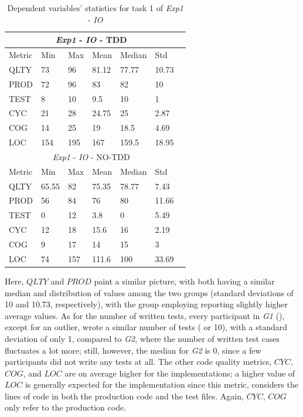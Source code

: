 \begin{table}[H]
    \begin{center} 
        \begin{tabular}{|p{1.8cm}||p{1.6cm}|p{1.6cm}|p{1.6cm}|p{1.6cm}|p{1.6cm}|p{1.6cm}|}
            \hline
                \multicolumn{6}{|c|}{\textit{Exp1} - \textit{IO} - TDD} \\
            \hline
                Metric & Min & Max & Mean & Median & Std \\
            \hline
                QLTY & 73 & 96 & 81.12 & 77.77 & 10.73 \\
                PROD & 72 & 96 & 83 & 82 & 10 \\
                TEST & 8 & 10 & 9.5 & 10 & 1 \\
                CYC & 21 & 28 & 24.75 & 25 & 2.87 \\
                COG & 14 & 25 & 19 & 18.5 & 4.69 \\
                LOC & 154 & 195 & 167 & 159.5 & 18.95 \\
            \hline\hline
                \multicolumn{6}{|c|}{\textit{Exp1} - \textit{IO} - NO-TDD} \\
            \hline
                Metric & Min & Max & Mean & Median & Std\\
            \hline
                QLTY & 65.55 & 82 & 75.35 & 78.77 & 7.43 \\
                PROD & 56 & 84 & 76 & 80 & 11.66 \\
                TEST & 0 & 12 & 3.8 & 0 & 5.49 \\
                CYC & 12 & 18 & 15.6 & 16 & 2.19 \\
                COG & 9 & 17 & 14 & 15 & 3 \\
                LOC & 74 & 157 & 111.6 & 100 & 33.69 \\
            \hline
        \end{tabular}
        \caption{\label{tab_dv_t1}Dependent variables' statistics for task 1 of \textit{Exp1} - \textit{IO}}
    \end{center}
\end{table}

Here, $QLTY$ and $PROD$ paint a similar picture, with both having a similar median and distribution of values among the two groups (standard deviations of 10 and 10.73, respectively), with the group employing \tdd reporting slightly higher average values.
As for the number of written tests, every participant in \textit{G1} (\tdd), except for an outlier, wrote a similar number of tests ( or 10), with a standard deviation of only 1, compared to \textit{G2}, where the number of written test cases fluctuates a lot more; still, however, the median for \textit{G2} is 0, since a few participants did not write any tests at all.
The other code quality metrics, $CYC$, $COG$, and $LOC$ are on average higher for the \tdd implementations; a higher value of $LOC$ is generally expected for the \tdd implementation since this metric, considers the lines of code in both the production code and the test files. Again, $CYC$, $COG$ only refer to the production code.

